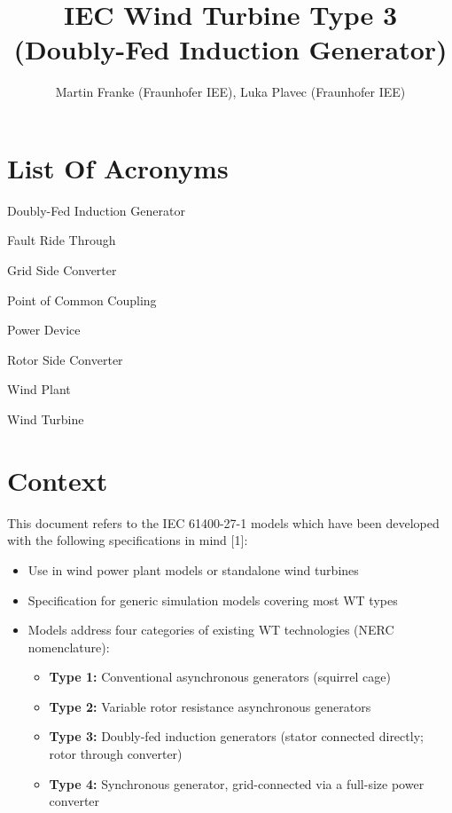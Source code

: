 \documentclass[
  a4paper,
  DIV=11,
  numbers=noendperiod]{scrartcl}
\title{IEC Wind Turbine Type 3 (Doubly-Fed Induction Generator)}
\author{Martin Franke (Fraunhofer IEE), Luka Plavec (Fraunhofer IEE)}
\date{}
\providecommand{\tightlist}{%
  \setlength{\itemsep}{0pt}\setlength{\parskip}{0pt}}\usepackage{longtable,booktabs,array}
\renewcommand*\contentsname{Table of contents}
\newcommand\contentsname{Table of contents}
\begin{document}
\maketitle

\renewcommand*\contentsname{Table of contents}
{
\hypersetup{linkcolor=}
\setcounter{tocdepth}{3}
\tableofcontents
}
\listoffigures
\listoftables

\section{List Of Acronyms}\label{acronyms_HEADER_LOA}

\begin{description}
\tightlist
\item[\phantomsection\label{acronyms_DFIG}{DFIG}]
Doubly-Fed Induction Generator
\item[\phantomsection\label{acronyms_FRT}{FRT}]
Fault Ride Through
\item[\phantomsection\label{acronyms_GSC}{GSC}]
Grid Side Converter
\item[\phantomsection\label{acronyms_PCC}{PCC}]
Point of Common Coupling
\item[\phantomsection\label{acronyms_PD}{PD}]
Power Device
\item[\phantomsection\label{acronyms_RSC}{RSC}]
Rotor Side Converter
\item[\phantomsection\label{acronyms_WP}{WP}]
Wind Plant
\item[\phantomsection\label{acronyms_WT}{WT}]
Wind Turbine
\end{description}

\section{Context}\label{context}

This document refers to the IEC 61400-27-1 models which have been
developed with the following specifications in mind {[}1{]}:

\begin{itemize}
\item
  Use in wind power plant models or standalone wind turbines
\item
  Specification for generic simulation models covering most WT types
\item
  Models address four categories of existing WT technologies (NERC
  nomenclature):

  \begin{itemize}
  \tightlist
  \item
    \textbf{Type 1:} Conventional asynchronous generators (squirrel
    cage)
  \item
    \textbf{Type 2:} Variable rotor resistance asynchronous generators
  \item
    \textbf{Type 3:} Doubly-fed induction generators (stator connected
    directly; rotor through converter)
  \item
    \textbf{Type 4:} Synchronous generator, grid-connected via a
    full-size power converter
  \end{itemize}
\end{itemize}
\end{document}

